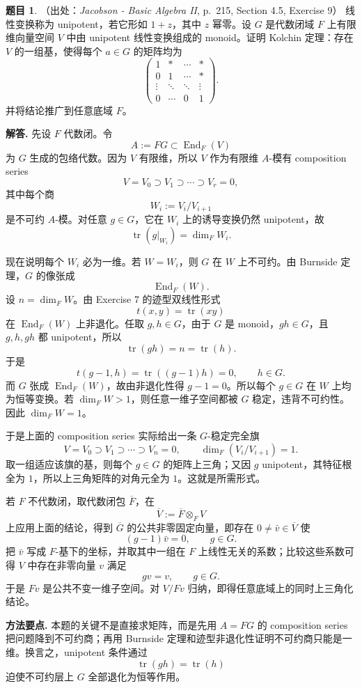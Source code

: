 \documentclass[a4paper]{ctexart}
\theoremstyle{definition}
\newtheorem{example}{题目}[section]
\theoremstyle{analysis}
\theoremstyle{plain}
\begin{document}
\begin{example}
（出处：\textit{Jacobson - Basic Algebra II}, p.~215, Section 4.5, Exercise 9）
线性变换称为 unipotent，若它形如 \(1+z\)，其中 \(z\) 幂零。设 \(G\) 是代数闭域 \(F\) 上有限维向量空间 \(V\) 中由 unipotent 线性变换组成的 monoid。证明 Kolchin 定理：存在 \(V\) 的一组基，使得每个 \(a\in G\) 的矩阵均为
\[
  \begin{pmatrix}
  1 & * & \cdots & *\\
  0 & 1 & \cdots & *\\
  \vdots & \ddots & \ddots & \vdots\\
  0 & \cdots & 0 & 1
  \end{pmatrix}.
\]
并将结论推广到任意底域 \(F\)。

\textbf{解答.}
先设 \(F\) 代数闭。令
\[
  A:=FG\subset \operatorname{End}_F(V)
\]
为 \(G\) 生成的包络代数。因为 \(V\) 有限维，所以 \(V\) 作为有限维 \(A\)-模有 composition series
\[
  V=V_0\supset V_1\supset\cdots\supset V_r=0,
\]
其中每个商
\[
  W_i:=V_i/V_{i+1}
\]
是不可约 \(A\)-模。对任意 \(g\in G\)，它在 \(W_i\) 上的诱导变换仍然 unipotent，故
\[
  \operatorname{tr}(g|_{W_i})=\dim_F W_i.
\]

现在说明每个 \(W_i\) 必为一维。若 \(W=W_i\)，则 \(G\) 在 \(W\) 上不可约。由 Burnside 定理，\(G\) 的像张成
\[
  \operatorname{End}_F(W).
\]
设 \(n=\dim_F W\)。由 Exercise 7 的迹型双线性形式
\[
  t(x,y)=\operatorname{tr}(xy)
\]
在 \(\operatorname{End}_F(W)\) 上非退化。任取 \(g,h\in G\)，由于 \(G\) 是 monoid，\(gh\in G\)，且 \(g,h,gh\) 都 unipotent，所以
\[
  \operatorname{tr}(gh)=n=\operatorname{tr}(h).
\]
于是
\[
  t(g-1,h)=\operatorname{tr}((g-1)h)=0,\qquad h\in G.
\]
而 \(G\) 张成 \(\operatorname{End}_F(W)\)，故由非退化性得 \(g-1=0\)。所以每个 \(g\in G\) 在 \(W\) 上均为恒等变换。若 \(\dim_F W>1\)，则任意一维子空间都被 \(G\) 稳定，违背不可约性。因此 \(\dim_F W=1\)。

于是上面的 composition series 实际给出一条 \(G\)-稳定完全旗
\[
  V=V_0\supset V_1\supset\cdots\supset V_n=0,\qquad \dim_F(V_i/V_{i+1})=1.
\]
取一组适应该旗的基，则每个 \(g\in G\) 的矩阵上三角；又因 \(g\) unipotent，其特征根全为 \(1\)，所以上三角矩阵的对角元全为 \(1\)。这就是所需形式。

若 \(F\) 不代数闭，取代数闭包 \(\overline F\)，在
\[
  \overline V:=\overline F\otimes_F V
\]
上应用上面的结论，得到 \(\overline G\) 的公共非零固定向量，即存在 \(0\neq \bar v\in\overline V\) 使
\[
  (g-1)\bar v=0,\qquad g\in G.
\]
把 \(\bar v\) 写成 \(F\)-基下的坐标，并取其中一组在 \(F\) 上线性无关的系数；比较这些系数可得 \(V\) 中存在非零向量 \(v\) 满足
\[
  gv=v,\qquad g\in G.
\]
于是 \(Fv\) 是公共不变一维子空间。对 \(V/Fv\) 归纳，即得任意底域上的同时上三角化结论。

\textbf{方法要点.}
本题的关键不是直接求矩阵，而是先用 \(A=FG\) 的 composition series 把问题降到不可约商；再用 Burnside 定理和迹型非退化性证明不可约商只能是一维。换言之，unipotent 条件通过
\[
  \operatorname{tr}(gh)=\operatorname{tr}(h)
\]
迫使不可约层上 \(G\) 全部退化为恒等作用。
\end{example}
\end{document}
